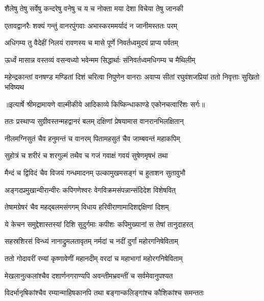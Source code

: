 \twolineshloka
{शैलेषु तेषु सर्वेषु कन्दरेषु वनेषु च}
{य च नोक्ता मया देशा विचेया तेषु जानकी} %

\twolineshloka
{एतावद्वानरैः शक्यं गन्तुं वानरपुंगवाः}
{अभास्करममर्यादं न जानीमस्ततः परम्} %

\twolineshloka
{अधिगम्य तु वैदेहीं निलयं रावणस्य च}
{मासे पूर्णे निवर्तध्वमुदयं प्राप्य पर्वतम्} %

\twolineshloka
{ऊर्ध्वं मासान्न वस्तव्यं वसन्वध्यो भवेन्मम}
{सिद्धार्थाः संनिवर्तध्वमधिगम्य च मैथिलीम्} %

\fourlineindentedshloka
{महेन्द्रकान्तां वनषण्ड मण्डितां}
{ दिशं चरित्वा निपुणेन वानराः}
{अवाप्य सीतां रघुवंशजप्रियां}
{ ततो निवृत्ताः सुखितो भविष्यथ} %


{॥इत्यार्षे श्रीमद्रामायणे वाल्मीकीये आदिकाव्ये किष्किन्धाकाण्डे एकोनचत्वारिंशः सर्गः॥}


\twolineshloka
{ततः प्रस्थाप्य सुग्रीवस्तन्महद्वानरं बलम्}
{दक्षिणां प्रेषयामास वानरानभिलक्षितान्} %

\twolineshloka
{नीलमग्निसुतं चैव हनुमन्तं च वानरम्}
{पितामहसुतं चैव जाम्बवन्तं महाकपिम्} %

\twolineshloka
{सुहोत्रं च शरीरं च शरगुल्मं तथैव च}
{गजं गवाक्षं गवयं सुषेणमृषभं तथा} %

\twolineshloka
{मैन्दं च द्विविदं चैव विजयं गन्धमादनम्}
{उल्कामुखमसङ्गं च हुताशन सुतावुभौ} %

\twolineshloka
{अङ्गदप्रमुखान्वीरान्वीरः कपिगणेश्वरः}
{वेगविक्रमसंपन्नान्संदिदेश विशेषवित्} %

\twolineshloka
{तेषामग्रेषरं चैव महद्बलमसंगगम्}
{विधाय हरिवीराणामादिशद्दक्षिणां दिशम्} %

\twolineshloka
{ये केचन समुद्देशास्तस्यां दिशि सुदुर्गमाः}
{कपीशः कपिमुख्यानां स तेषां तानुदाहरत्} %

\twolineshloka
{सहस्रशिरसं विन्ध्यं नानाद्रुमलतावृतम्}
{नर्मदां च नदीं दुर्गां महोरगनिषेविताम्} %

\twolineshloka
{ततो गोदावरीं रम्यां कृष्णावेणीं महानदीम्}
{वरदां च महाभागां महोरगनिषेविताम्} %

\twolineshloka
{मेखलानुत्कलांश्चैव दशार्णनगराण्यपि}
{अवन्तीमभ्रवन्तीं च सर्वमेवानुपश्यत} %

\twolineshloka
{विदर्भानृषिकांश्चैव रम्यान्माहिषकानपि}
{तथा बङ्गान्कलिङ्गांश्च कौशिकांश्च समन्ततः} %

